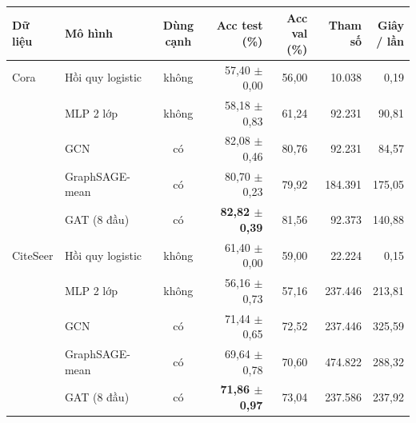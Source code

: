 \begin{tabular}{llcrrrr}
\toprule
Dữ liệu & Mô hình & Dùng cạnh & \makecell[r]{Acc test\\(\%)} & \makecell[r]{Acc val\\(\%)} & Tham số & \makecell[r]{Giây\\/ lần} \\
\midrule
Cora & Hồi quy logistic & không & 57{,}40 $\pm$ 0{,}00 & 56{,}00 & 10{.}038 & 0{,}19 \\
 & MLP 2 lớp & không & 58{,}18 $\pm$ 0{,}83 & 61{,}24 & 92{.}231 & 90{,}81 \\
 & GCN & có & 82{,}08 $\pm$ 0{,}46 & 80{,}76 & 92{.}231 & 84{,}57 \\
 & GraphSAGE-mean & có & 80{,}70 $\pm$ 0{,}23 & 79{,}92 & 184{.}391 & 175{,}05 \\
 & GAT (8 đầu) & có & \textbf{82{,}82 $\pm$ 0{,}39} & 81{,}56 & 92{.}373 & 140{,}88 \\
\midrule
CiteSeer & Hồi quy logistic & không & 61{,}40 $\pm$ 0{,}00 & 59{,}00 & 22{.}224 & 0{,}15 \\
 & MLP 2 lớp & không & 56{,}16 $\pm$ 0{,}73 & 57{,}16 & 237{.}446 & 213{,}81 \\
 & GCN & có & 71{,}44 $\pm$ 0{,}65 & 72{,}52 & 237{.}446 & 325{,}59 \\
 & GraphSAGE-mean & có & 69{,}64 $\pm$ 0{,}78 & 70{,}60 & 474{.}822 & 288{,}32 \\
 & GAT (8 đầu) & có & \textbf{71{,}86 $\pm$ 0{,}97} & 73{,}04 & 237{.}586 & 237{,}92 \\
\bottomrule
\end{tabular}
